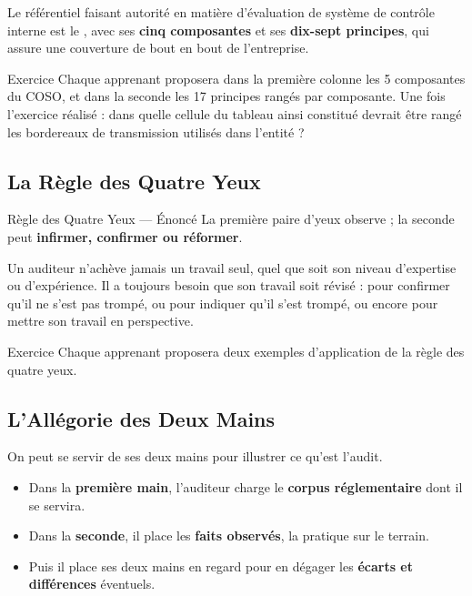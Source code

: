 Le référentiel faisant autorité en matière d'évaluation de système de contrôle interne
est le , avec ses \textbf{cinq composantes} et ses
\textbf{dix-sept principes}, qui assure une couverture de bout en bout de l'entreprise.

\begin{boxexo}{Exercice}
Chaque apprenant proposera dans la première colonne les 5 composantes du COSO,
et dans la seconde les 17 principes rangés par composante. Une fois l'exercice
réalisé : dans quelle cellule du tableau ainsi constitué devrait être rangé les
bordereaux de transmission utilisés dans l'entité ?
\end{boxexo}

\subsection{La Règle des Quatre Yeux}

\begin{boiteTheoreme}[]{Règle des Quatre Yeux — Énoncé}
La première paire d'yeux observe ; la seconde peut \textbf{infirmer, confirmer ou
réformer}.
\end{boiteTheoreme}

Un auditeur n'achève jamais un travail seul, quel que soit son niveau d'expertise ou
d'expérience. Il a toujours besoin que son travail soit révisé : pour confirmer qu'il ne
s'est pas trompé, ou pour indiquer qu'il s'est trompé, ou encore pour mettre son
travail en perspective.

\begin{boxexo}{Exercice}
Chaque apprenant proposera deux exemples d'application de la règle des quatre yeux.
\end{boxexo}

\subsection{L'Allégorie des Deux Mains}

On peut se servir de ses deux mains pour illustrer ce qu'est l'audit.

\begin{itemize}
  \item Dans la \textbf{première main}, l'auditeur charge le
    \textbf{corpus réglementaire} dont il se servira.
  \item Dans la \textbf{seconde}, il place les \textbf{faits observés}, la pratique
    sur le terrain.
  \item Puis il place ses deux mains en regard pour en dégager les
    \textbf{écarts et différences} éventuels.
\end{itemize}

